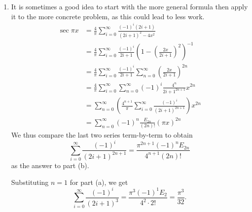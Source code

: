 \begin{enumerate}[wide, labelindent = 0pt, label = (\alph*)]
\item
It is sometimes a good idea to start with the more general formula then apply it to the more concrete problem,
as this could lead to less work.
\begin{align*}
	\sec \pi x
	&= \frac{4}{\pi} \sum_{i = 0}^\infty \frac{{(-1)}^i (2i + 1)}{{(2i + 1)}^2 - 4x^2} \\
	&= \frac{4}{\pi} \sum_{i = 0}^\infty \frac{{(-1)}^i}{2i + 1} {\left(
		1 - {\left( \frac{2x}{2i + 1} \right)}^2
	\right)}^{-1} \\
	&= \frac{4}{\pi} \sum_{i = 0}^\infty \frac{{(-1)}^i}{2i + 1} \sum_{n = 0}^\infty {\left(
		\frac{2x}{2i + 1}
	\right)}^{2n} \\
	&= \frac{4}{\pi} \sum_{i = 0}^\infty \sum_{n = 0}^\infty {(-1)}^i \frac{4^n}{{2i + 1}^{2n + 1}} x^{2n} \\
	&= \sum_{n = 0}^\infty \left(
		\frac{4^{n + 1}}{\pi} \sum_{i = 0}^\infty \frac{{(-1)}^i}{{(2i + 1)}^{2n + 1}}
	\right) x^{2n} \\
	&= \sum_{n = 0}^\infty {(-1)}^n \frac{E_{2n}}{(2n)!} {(\pi x)}^{2n}
\end{align*}
We thus compare the last two series term-by-term to obtain
\[
	\sum_{i = 0}^\infty \frac{{(-1)}^i}{{(2i + 1)}^{2n + 1}}
	= \frac{\pi^{2n + 1} {(-1)}^n E_{2n}}{4^{n + 1} (2n)!}
\]
as the answer to part (b).

Substituting $n = 1$ for part (a), we get
\[
	\sum_{i = 0}^\infty \frac{{(-1)}^i}{{(2i + 1)}^3}
	= \frac{\pi^3 {(-1)}^1 E_{2}}{4^2 \cdot 2!}
	= \frac{\pi^3}{32}.
\]
\end{enumerate}